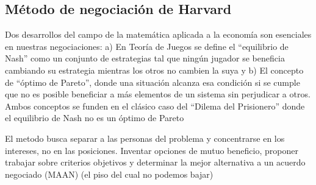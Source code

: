 \documentclass[titlepage,a4paper]{article}
\begin{document}
\subsection*{Método de negociación de Harvard}
Dos desarrollos del campo de la matemática aplicada a la economía son esenciales en nuestras
negociaciones: a) En Teoría de Juegos se define el “equilibrio de Nash” como un conjunto de
estrategias tal que ningún jugador se beneficia cambiando su estrategia mientras los otros no cambien
la suya y b) El concepto de “óptimo de Pareto”, donde una situación alcanza esa condición si se cumple
que no es posible beneficiar a más elementos de un sistema sin perjudicar a otros. Ambos conceptos
se funden en el clásico caso del “Dilema del Prisionero” donde el equilibrio de Nash no es un óptimo
de Pareto

El metodo busca separar a las personas del problema y concentrarse en los intereses, no en las posiciones. Inventar opciones de mutuo beneficio, proponer trabajar sobre criterios objetivos y determinar la mejor alternativa a un acuerdo negociado (MAAN) (el piso del cual no podemos bajar)
\end{document}
